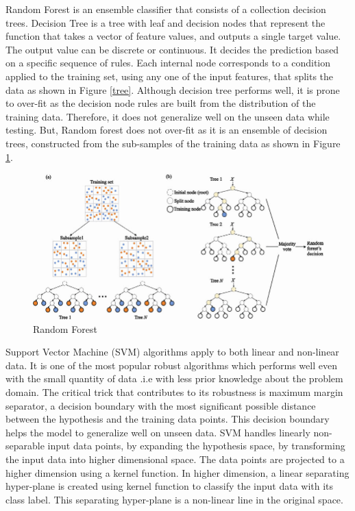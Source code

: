 \documentclass[12pt]{report} %
\begin{document}
Random Forest is an ensemble classifier that consists of a collection decision trees. Decision Tree is a tree with leaf and decision nodes that represent the function that takes a vector of feature values, and outputs a single target value. The output value can be discrete or continuous. It decides the prediction based on a specific sequence of rules. Each internal node corresponds to a condition applied to the training set, using any one of the input features, that splits the data as shown in Figure \ref{tree}. Although decision tree performs well, it is prone to over-fit as the decision node rules are built from the distribution of the training data. Therefore, it does not generalize well on the unseen data while testing. But, Random forest does not over-fit as it is an ensemble of decision trees, constructed from the sub-samples of the training data as shown in Figure \ref{rf}. 

\begin{figure}[!tbp]
	\centering
	\caption{Random Forest}
	\label{rf}
	\includegraphics[scale=0.40]{image/rf.jpg}
\end{figure}

Support Vector Machine (SVM) algorithms apply to both linear and non-linear data. It is one of the most popular robust algorithms which performs well even with the small quantity of data .i.e with less prior knowledge about the problem domain. The critical trick that contributes to its robustness is maximum margin separator, a decision boundary with the most significant possible distance between the hypothesis and the training data points. This decision boundary helps the model to generalize well on unseen data. SVM handles linearly non-separable input data points, by expanding the hypothesis space, by transforming the input data into higher dimensional space. The data points are projected to a higher dimension using a kernel function. In higher dimension, a linear separating hyper-plane is created using kernel function to classify the input data with its class label. This separating hyper-plane is a non-linear line in the original space. 
\end{document}
